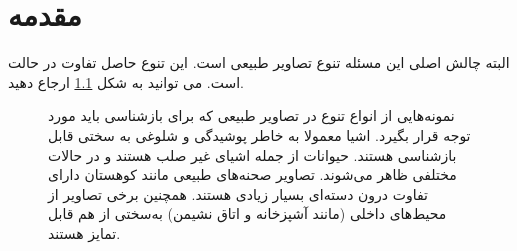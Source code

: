 \chapter{مقدمه}\label{chap:1}

البته چالش اصلی این مسئله تنوع تصاویر طبیعی است. این تنوع حاصل تفاوت در حالت
است. می توانید به شکل
\ref{fig:1:variation}
ارجاع دهید.

\begin{figure}
	\centering
	\caption[نمونه‌هایی از انواع تنوع در تصاویر طبیعی که برای بازشناسی باید مورد توجه قرار بگیرد]{نمونه‌هایی از انواع تنوع در تصاویر طبیعی که برای بازشناسی باید مورد توجه قرار بگیرد\cite{phdlazeb}.
 اشیا معمولا به خاطر پوشیدگی و شلوغی به سختی قابل بازشناسی هستند. حیوانات از جمله اشیای غیر صلب هستند و در حالات مختلفی ظاهر می‌شوند.
 تصاویر صحنه‌های طبیعی مانند کوهستان دارای تفاوت درون دسته‌ای بسیار زیادی هستند. همچنین برخی تصاویر از محیط‌های داخلی (مانند آشپزخانه و اتاق نشیمن) به‌سختی از هم قابل تمایز هستند.}
	\label{fig:1:variation}
\end{figure}